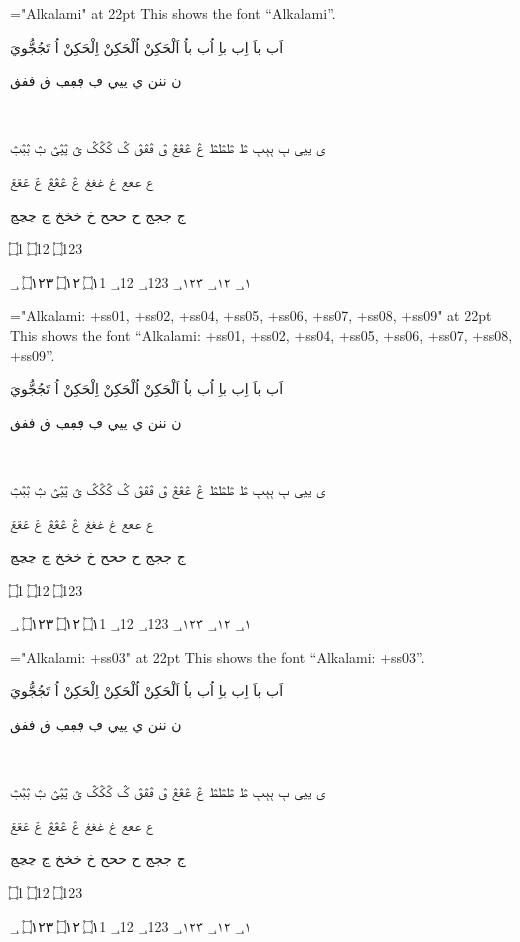 

\vsize=9.5in
\nopagenumbers
\parindent=0pt
\def\testFont#1{
  \font\x="#1" at 22pt \x
    This shows the font “#1”. \par\touching\par\warsh\par\imala\par\wagaf\par\ain\par\jeem\par\endayahA\par\endayahB \number\par}

\baselineskip=20pt

\def\warsh{\beginR  ن ننن      ي ييي      ڢ ڢڢڢ      ڧ ڧڧڧ \endR} %
\def\touching{\beginR اَب باَ  اِب باِ اُب باُ  اَلْحَكِنْ اُلْحَكِنْ اِلْحَكِنْ  اُ تَجُجُّويَ  \endR} %
\def\number{\beginR ؀1 ؀12 ؀123 ؀١ ؀١٢ ؀١٢٣ \endR} 
\def\endayahA{\beginR ۝1   ۝12   ۝123   \endR} %
\def\endayahB{\beginR ۝١   ۝١٢   ۝١٢٣ \endR} %
\def\imala{\beginR بٜ  \endR} %
\def\wagaf{\beginR ی ییی      ٻ ٻٻٻ  ڟ ڟڟڟ  ڠ ڠڠڠ    ڨ ڨڨڨ    ݣ ݣݣݣ ؿ ؿؿؿ ݑ ݑݑݑ \endR} %
\def\ain{\beginR  ع ععع غ غغغ ڠ ڠڠڠ ݝ ݝݝݝ  \endR} %
\def\jeem{\beginR ج ججج ح ححح خ خخخ ڃ ڃڃڃ   \endR} %
\def\lamalef{\beginR لإ ‍لإ لَإِ ‍لَإِ لأ ‍لأ لَأَ ‍لَأَ لإ ‍لإ لَإِ ‍لَإِ لأ ‍لأ لَأَ ‍لَأَ لآ ‍لآ لَآَ ‍لَآَ لا ‍لا لَاَ ‍لَاَ \endR} 
\bigskip


\testFont{Alkalami}

\bigskip

\testFont{Alkalami:
       +ss01, +ss02, +ss04, +ss05, +ss06, +ss07, +ss08, +ss09}

\bigskip

\testFont{Alkalami:
       +ss03}

\bigskip


\bigskip

\bye

